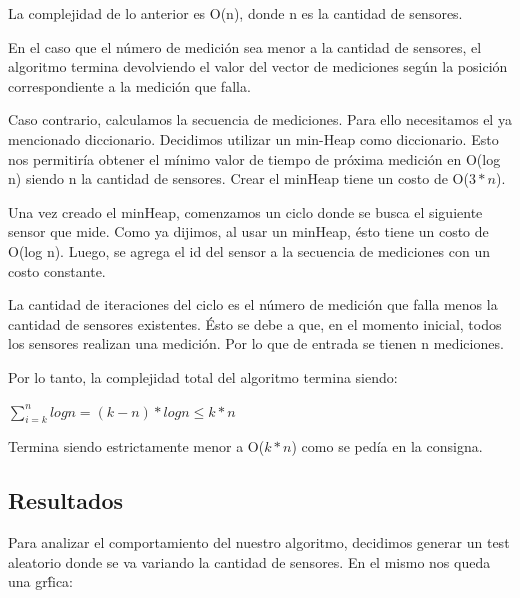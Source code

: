 \quad La complejidad de lo anterior es O(n), donde n es la cantidad de sensores.

\quad En el caso que el n\'umero de medici\'on sea menor a la cantidad de sensores, el algoritmo termina devolviendo el valor del vector de mediciones seg\'un la posici\'on correspondiente a la medici\'on que falla.

\quad Caso contrario, calculamos la secuencia de mediciones. Para ello necesitamos el ya mencionado diccionario. Decidimos utilizar un min-Heap como diccionario. Esto nos permitir\'ia obtener el m\'inimo valor de tiempo de pr\'oxima medici\'on en O(log n) siendo n la cantidad de sensores. Crear el minHeap tiene un costo de O($ 3*n $).

\quad Una vez creado el minHeap, comenzamos un ciclo donde se busca el siguiente sensor que mide. Como ya dijimos, al usar un minHeap, \'esto tiene un costo de O(log n). Luego, se agrega el id del sensor a la secuencia de mediciones con un costo constante.

\quad La cantidad de iteraciones del ciclo es el n\'umero de medici\'on que falla menos la cantidad de sensores existentes. \'Esto se debe a que, en el momento inicial, todos los sensores realizan una medici\'on. Por lo que de entrada se tienen n mediciones.

\quad Por lo tanto, la complejidad total del algoritmo termina siendo:


\quad


$ \displaystyle\sum_{i = k}^{n} log n = (k - n) * log n \leq k * n$


\quad


\quad Termina siendo estrictamente menor a O($ k*n $) como se ped\'ia en la consigna.


\quad


\subsection{Resultados}

\quad Para analizar el comportamiento del nuestro algoritmo, decidimos generar un test aleatorio donde se va variando la cantidad de sensores. En el mismo nos queda una gr\'fica:


\quad


